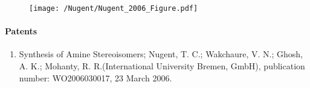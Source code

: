 \begin{figure}[ht]
  \begin{center}
    \texttt{[image: /Nugent/Nugent\_2006\_Figure.pdf]}
    \label{fig:profNugent}
  \end{center}
\end{figure}

\paragraph{Patents}
\begin{enumerate}
\item Synthesis of Amine Stereoisomers; Nugent, T. C.; Wakchaure, V. N.; Ghosh, A. K.;
  Mohanty, R. R.(International University Bremen, GmbH), publication number: WO2006030017,
  23 March 2006. 
\end{enumerate}

\nocite{Nugent1}
\nocite{Nugent2}
\nocite{Nugent3}

